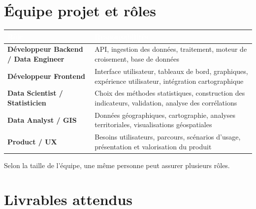\documentclass[11pt,a4paper]{article}
\begin{document}
\section{Équipe projet et rôles}

\begin{longtable}{@{}>{\bfseries}p{4.6cm} p{9.9cm}@{}}
\rowcolor{navy}
\textcolor{white}{Rôle} & \textcolor{white}{Responsabilités} \\
\endhead
Développeur Backend / Data Engineer & API, ingestion des données, traitement, moteur de croisement, base de données \\
Développeur Frontend & Interface utilisateur, tableaux de bord, graphiques, expérience utilisateur, intégration cartographique \\
Data Scientist / Statisticien & Choix des méthodes statistiques, construction des indicateurs, validation, analyse des corrélations \\
Data Analyst / GIS & Données géographiques, cartographie, analyses territoriales, visualisations géospatiales \\
Product / UX & Besoins utilisateurs, parcours, scénarios d'usage, présentation et valorisation du produit \\
\end{longtable}

Selon la taille de l'équipe, une même personne peut assurer plusieurs rôles.

\section{Livrables attendus}
\end{document}

